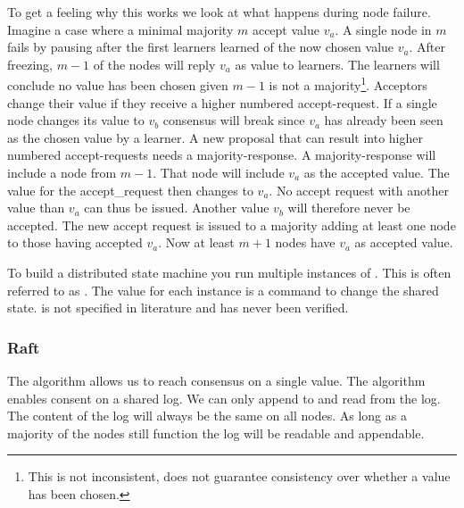 
To get a feeling why this works we look at what happens during node failure. Imagine a case where a minimal majority $m$ accept value $v_a$. A single node in $m$ fails by pausing after the first learners learned of the now chosen value $v_a$. After freezing, $m-1$ of the nodes will reply $v_a$ as value to learners. The learners will conclude no value has been chosen given $m-1$ is not a majority\footnote{This is not inconsistent, \paxos{} does not guarantee consistency over whether a value has been chosen.}. Acceptors change their value if they receive a higher numbered accept-request. If a single node changes its value to $v_b$ consensus will break since $v_a$ has already been seen as the chosen value by a learner. A new proposal that can result into higher numbered accept-requests needs a majority-response. A majority-response will include a node from $m-1$. That node will include $v_a$ as the accepted value. The value for the accept\_request then changes to $v_a$. No accept request with another value than $v_a$ can thus be issued. Another value $v_b$ will therefore never be accepted. The new accept request is issued to a majority adding at least one node to those having accepted $v_a$. Now at least $m+1$ nodes have $v_a$ as accepted value.

To build a distributed state machine you run multiple instances of \paxos{}. This is often referred to as \multipaxos{}. The value for each instance is a command to change the shared state. \multipaxos{} is not specified in literature and has never been verified.

\subsubsection*{Raft} \label{sec:raft}
The \paxos{} algorithm allows us to reach consensus on a single value. The \raft{} algorithm enables consent on a shared log. We can only append to and read from the log. The content of the log will always be the same on all nodes. As long as a majority of the nodes still function the log will be readable and appendable.

